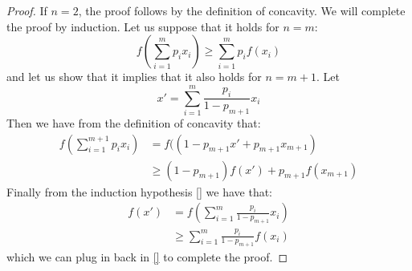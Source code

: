 \begin{proof}
If $n=2$, the proof follows by the definition of concavity. We will complete the proof by induction.
Let us suppose that it holds for $n=m$: 
\begin{equation}
 f\left(\sum_{i=1}^mp_ix_i\right) \geq \sum_{i=1}^mp_if(x_i) 
\end{equation}
and let us show that it implies that it also holds for $n=m+1$. Let 
\begin{equation}
x'=\sum_{i=1}^m\frac{p_i}{1-p_{m+1}}x_i
\end{equation}
Then we have from the definition of concavity that:
\begin{align}
f\left(\sum_{i=1}^{m+1}p_ix_i\right) &= f((1-p_{m+1}x'+p_{m+1}x_{m+1})\\
                                     &\geq (1-p_{m+1})f(x')+p_{m+1}f(x_{m+1})
\end{align}
Finally from the induction hypothesis \eqref{} we have that:
\begin{align}
f(x')&=f\left(\sum_{i=1}^m\frac{p_i}{1-p_{m+1}}x_i\right)\\
     &\geq \sum_{i=1}^m\frac{p_i}{1-p_{m+1}}f(x_i)
\end{align}
which we can plug in back in \eqref{} to complete the proof.
\end{proof}
%

